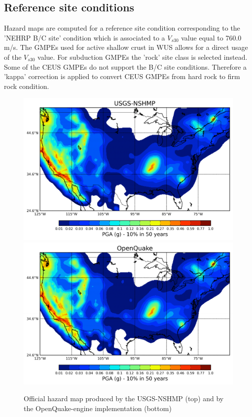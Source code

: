 \subsection{Reference site conditions}
Hazard maps are computed for a reference site condition corresponding to the
'NEHRP B/C site' condition which is associated to a $V_{s30}$ value equal to
760.0 m/s. The GMPEs used for active shallow crust in WUS allows for a direct
usage of the $V_{s30}$ value. For subduction GMPEs the 'rock' site class is
selected instead. Some of the CEUS GMPEs do not support the B/C site conditions.
Therefore a 'kappa' correction is applied to convert CEUS GMPEs from hard rock
to firm rock condition.
%
\begin{figure}
\centering
\includegraphics[width=14cm]{./qareport/pictures/map_usa_PGA_0pt1_NSHMP.pdf}
\includegraphics[width=14cm]{./qareport/pictures/map_usa_PGA_0pt1_OQ.pdf}
\caption{Official hazard map produced by the USGS-NSHMP (top) and by the OpenQuake-engine implementation (bottom)}
\label{fig:usa_475y_hmaps}
\end{figure}
